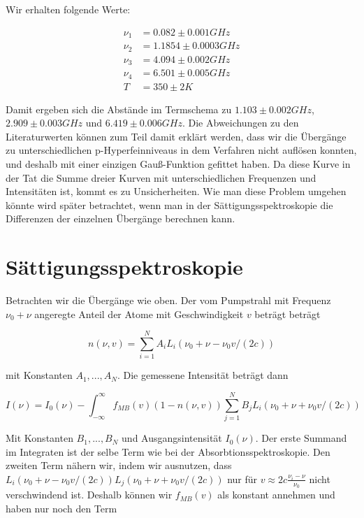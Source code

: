 \documentclass[a4paper,parskip]{scrartcl}
\begin{document}
Wir erhalten folgende Werte:

\begin{align*}
\nu_1 &= 0.082 \pm 0.001 GHz \\
\nu_2 &= 1.1854 \pm 0.0003 GHz \\
\nu_3 &= 4.094 \pm 0.002 GHz\\
\nu_4 &= 6.501 \pm 0.005 GHz \\
T&=350 \pm 2 K
\end{align*}

Damit ergeben sich die Abstände im Termschema zu $1.103 \pm 0.002 GHz$,  $2.909 \pm 0.003 GHz$ und $6.419 \pm 0.006 GHz$. Die Abweichungen zu den Literaturwerten können zum Teil damit erklärt werden, %
dass wir die Übergänge zu unterschiedlichen p-Hyperfeinniveaus in dem Verfahren nicht auflösen konnten, und deshalb mit einer einzigen Gauß-Funktion gefittet haben. Da diese Kurve in der Tat die Summe dreier Kurven mit unterschiedlichen Frequenzen und Intensitäten ist, kommt es zu Unsicherheiten. Wie man diese Problem umgehen könnte wird später betrachtet, wenn man in der Sättigungsspektroskopie die Differenzen der einzelnen Übergänge berechnen kann.

\section{Sättigungsspektroskopie}

Betrachten wir die Übergänge wie oben. Der vom Pumpstrahl mit Frequenz $\nu_0+\nu$ angeregte Anteil der Atome mit Geschwindigkeit $v$ beträgt beträgt

$$n(\nu, v) = \sum_{i=1}^N A_i L_i(\nu_0+\nu-\nu_0 v/(2c))$$

mit Konstanten $A_1, ..., A_N$. Die gemessene Intensität beträgt dann

$$I(\nu) = I_0(\nu)-\int_{-\infty}^{\infty} f_{MB}(v)(1-n(\nu, v))\sum_{j=1}^N B_j L_i(\nu_0+\nu+\nu_0 v/(2c))$$

Mit Konstanten $B_1, ..., B_N$ und Ausgangsintensität $I_0(\nu)$. Der erste Summand im Integraten ist der selbe Term wie bei der Absorbtionsspektroskopie. Den zweiten Term nähern wir, indem wir ausnutzen, dass  $L_i(\nu_0+\nu-\nu_0 v/(2c)) L_j(\nu_0+\nu+\nu_0 v/(2c))$ nur für $v \approx 2c \frac{\nu_i-\nu}{\nu_0}$ nicht verschwindend ist. Deshalb können wir $f_{MB}(v)$ als konstant annehmen und haben nur noch den Term
\end{document}
